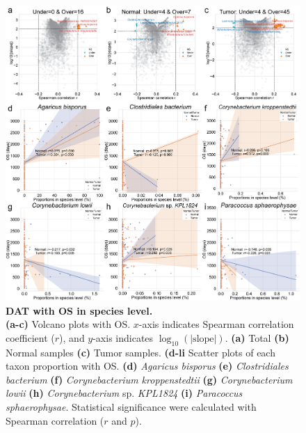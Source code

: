 \documentclass[11pt, a4paper, onecolumn, oneside]{report}
\begin{document}
            \begin{figure}[p]
                \centering
                \includegraphics[width=\linewidth]{Figures/CRC/Figure_09.png}
                \caption[DAT with OS in species level]{\textbf{DAT with OS in species level.}\\
                    \textbf{(a-c)} Volcano plots with OS. $x$-axis indicates Spearman correlation coefficient ($r$), and $y$-axis indicates $\log_{10} (| \textrm{slope} |)$. \textbf{(a)} Total \textbf{(b)} Normal samples \textbf{(c)} Tumor samples. \textbf{(d-li} Scatter plots of each taxon proportion with OS. \textbf{(d)} \textit{Agaricus bisporus} \textbf{(e)} \textit{Clostridiales bacterium} \textbf{(f)} \textit{Corynebacterium kroppenstedtii} \textbf{(g)} \textit{Corynebacterium lowii} \textbf{(h)} \textit{Corynebacterium} sp. \textit{KPL1824} \textbf{(i)} \textit{Paracoccus sphaerophysae}. Statistical significance were calculated with Spearman correlation ($r$ and $p$).}
                \label{fig:CRC-DAT-OS}
            \end{figure}
            \clearpage
\end{document}
